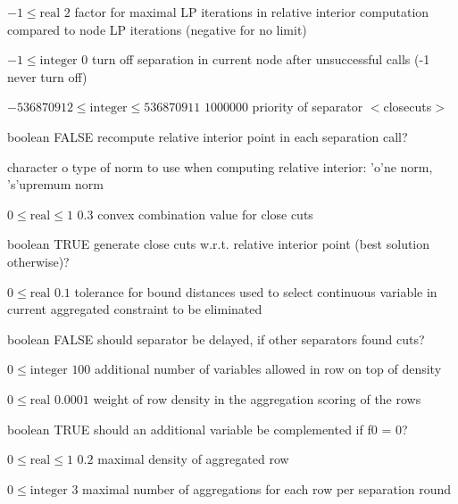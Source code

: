 %
{$-1\leq\textrm{real}$}%
{$2$}%
{factor for maximal LP iterations in relative interior computation compared to node LP iterations (negative for no limit)}%
{}

%
{$-1\leq\textrm{integer}$}%
{$0$}%
{turn off separation in current node after unsuccessful calls (-1 never turn off)}%
{}

%
{$-536870912\leq\textrm{integer}\leq536870911$}%
{$1000000$}%
{priority of separator $<$closecuts$>$}%
{}

%
{boolean}%
{FALSE}%
{recompute relative interior point in each separation call?}%
{}

%
{character}%
{o}%
{type of norm to use when computing relative interior: 'o'ne norm, 's'upremum norm}%
{}

%
{$0\leq\textrm{real}\leq1$}%
{$0.3$}%
{convex combination value for close cuts}%
{}

%
{boolean}%
{TRUE}%
{generate close cuts w.r.t. relative interior point (best solution otherwise)?}%
{}

%
{$0\leq\textrm{real}$}%
{$0.1$}%
{tolerance for bound distances used to select continuous variable in current aggregated constraint to be eliminated}%
{}

%
{boolean}%
{FALSE}%
{should separator be delayed, if other separators found cuts?}%
{}

%
{$0\leq\textrm{integer}$}%
{$100$}%
{additional number of variables allowed in row on top of density}%
{}

%
{$0\leq\textrm{real}$}%
{$0.0001$}%
{weight of row density in the aggregation scoring of the rows}%
{}

%
{boolean}%
{TRUE}%
{should an additional variable be complemented if f0 = 0?}%
{}

%
{$0\leq\textrm{real}\leq1$}%
{$0.2$}%
{maximal density of aggregated row}%
{}

%
{$0\leq\textrm{integer}$}%
{$3$}%
{maximal number of aggregations for each row per separation round}%
{}

